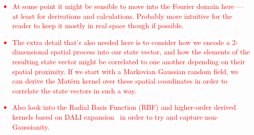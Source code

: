 \textcolor{red}{
\begin{itemize}
\item{At some point it might be sensible to move into the Fourier domain here --- at least for derivations and calculations. Probably more intuitive for the reader to keep it mostly in real space though if possible.} 
\item{The extra detail that's also needed here is to consider how we encode a 2-dimensional spatial process into our state vector, and how the elements of the resulting state vector might be correlated to one another depending on their spatial proximity. If we start with a Markovian Gaussian random field, we can derive the Mat\'{e}rn kernel over these spatial coordinates in order to correlate the state vectors in such a way.} 
\item{Also look into the Radial Basis Function (RBF) and higher-order derived kernels based on DALI expansion~\cite{sellentin2014breaking} in order to try and capture non-Gaussianity.}
\end{itemize}
}
